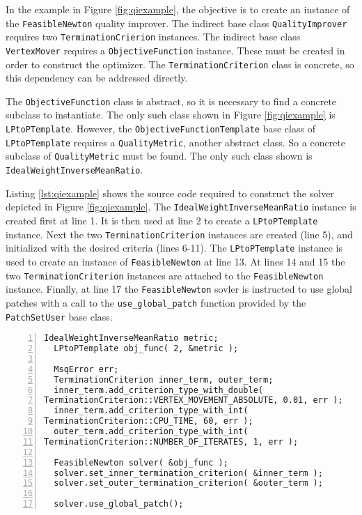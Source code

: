 \documentclass{article}
\begin{document}
In the example in Figure \ref{fig:qiexample}, the objective is to create an instance of the \texttt{FeasibleNewton} quality improver.  The indirect base class \texttt{QualityImprover} requires two \texttt{TerminationCrierion} instances.   The indirect base class \texttt{VertexMover} requires a \texttt{ObjectiveFunction} instance. These must be created in order to construct the optimizer.  The \texttt{TerminationCriterion} class is concrete, so this dependency can be addressed directly.  

The \texttt{ObjectiveFunction} class is abstract, so it is necessary to find a concrete subclass to instantiate.  The only such class shown in Figure \ref{fig:qiexample} is \texttt{LPtoPTemplate}.  However, the \texttt{ObjectiveFunctionTemplate} base class of \texttt{LPtoPTemplate} requires a \texttt{QualityMetric}, another abstract class.  So a concrete subclass of \texttt{QualityMetric} must be found.  The only such class shown is \texttt{IdealWeightInverseMeanRatio}.  

Listing \ref{lst:qiexample} shows the source code required to construct the solver depicted in Figure \ref{fig:qiexample}.  The \texttt{IdealWeightInverseMeanRatio} instance is created first at line 1.  It is then used at line 2 to create a \texttt{LPtoPTemplate} instance.  Next the two \texttt{TerminationCriterion} instances are created (line 5), and initialized with the desired criteria (lines 6-11).  The \texttt{LPtoPTemplate} instance is used to create an instance of \texttt{FeasibleNewton} at line 13.  At lines 14 and 15 the two \texttt{TerminationCriterion} instances are attached to the \texttt{FeasibleNewton} instance.  Finally, at line 17 the \texttt{FeasibleNewton} sovler is instructed to use global patches with a call to the \texttt{use\_global\_patch} function provided by the \texttt{PatchSetUser} base class.

\begin{lstlisting}[caption={Example Quality Improver},label={lst:qiexample},numbers=left] 
  IdealWeightInverseMeanRatio metric;
  LPtoPTemplate obj_func( 2, &metric );
  
  MsqError err;
  TerminationCriterion inner_term, outer_term;
  inner_term.add_criterion_type_with_double( 
TerminationCriterion::VERTEX_MOVEMENT_ABSOLUTE, 0.01, err );
  inner_term.add_criterion_type_with_int( 
TerminationCriterion::CPU_TIME, 60, err );
  outer_term.add_criterion_type_with_int( 
TerminationCriterion::NUMBER_OF_ITERATES, 1, err );

  FeasibleNewton solver( &obj_func );
  solver.set_inner_termination_criterion( &inner_term );
  solver.set_outer_termination_criterion( &outer_term );
  
  solver.use_global_patch();
\end{lstlisting}
\end{document}
